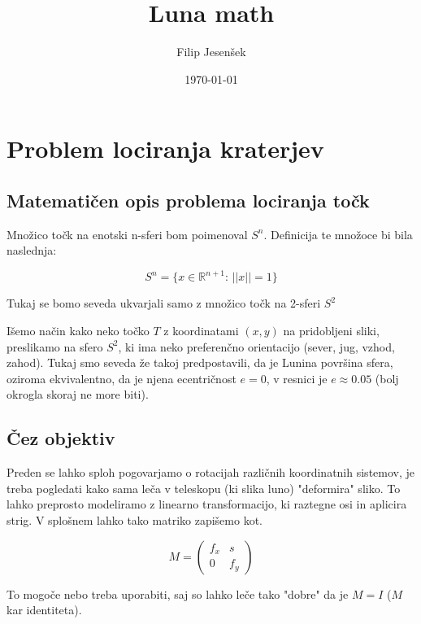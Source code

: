 \documentclass{article}
\title{Luna math}
\author{Filip Jesenšek}
\date{\today}
\begin{document}
\maketitle

\newpage

\section{Problem lociranja kraterjev}

\subsection{Matematičen opis problema lociranja točk}
Množico točk na enotski n-sferi bom poimenoval $S^n$. Definicija te množoce bi bila naslednja:

\begin{equation}
	S^n = \{x \in \mathbb{R}^{n+1} : \, ||x|| = 1\}
	\label{eq:definition_sphear}
\end{equation}

Tukaj se bomo seveda ukvarjali samo z množico točk na 2-sferi $S^2$

Išemo način kako neko točko $T$ z koordinatami $(x, y)$ na pridobljeni sliki, preslikamo na sfero $S^2$, 
ki ima neko preferenčno orientacijo (sever, jug, vzhod, zahod). Tukaj smo seveda že takoj predpostavili,
da je Lunina površina sfera, oziroma ekvivalentno, da je njena ecentričnost $e = 0$, 
v resnici je $e \approx 0.05$ (bolj okrogla skoraj ne more biti).

\subsection{Čez objektiv}
Preden se lahko sploh pogovarjamo o rotacijah različnih koordinatnih sistemov, je treba pogledati kako sama 
leča v teleskopu (ki slika luno) "deformira" sliko. To lahko preprosto modeliramo z linearno transformacijo,
ki raztegne osi in aplicira strig. V splošnem lahko tako matriko zapišemo kot.

\begin{equation}
	M = 
	\begin{pmatrix}
		f_x & s \\
		0 & f_y
	\end{pmatrix}
	\label{eq:lense_deformation}
\end{equation}

To mogoče nebo treba uporabiti, saj so lahko leče tako "dobre" da je $M = I$ ($M$ kar identiteta).
\end{document}
